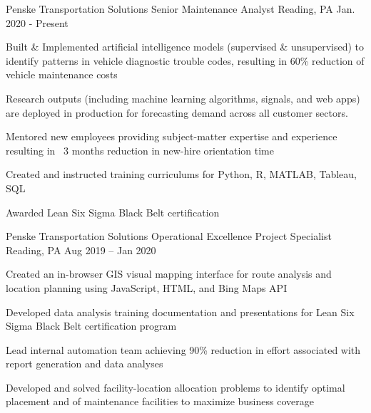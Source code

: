 


\begin{cventries}


\cventry
{Penske Transportation Solutions} %
{Senior Maintenance Analyst} %
{Reading, PA} %
{Jan. 2020 - Present} %
{ %
\begin{cvitems}
\item {Built \& Implemented artificial intelligence models (supervised \& unsupervised) to identify patterns in vehicle diagnostic trouble codes, resulting in 60\% reduction of vehicle maintenance costs}
\item {Research outputs (including machine learning algorithms, signals, and web apps) are deployed in production for forecasting demand across all customer sectors.}
\item {Mentored new employees providing subject-matter expertise and experience resulting in ~3 months reduction in new-hire orientation time}
\item {Created and instructed training curriculums for Python, R, MATLAB, Tableau, SQL}
\item {Awarded Lean Six Sigma Black Belt certification}
\end{cvitems}
}


\cventry
{Penske Transportation Solutions} %
{Operational Excellence Project Specialist} %
{Reading, PA} %
{Aug 2019 – Jan 2020} %
{ %
\begin{cvitems}
\item {Created an in-browser GIS visual mapping interface for route analysis and location planning using JavaScript, HTML, and Bing Maps API}
\item {Developed data analysis training documentation and presentations for Lean Six Sigma Black Belt certification program}
\item {Lead internal automation team achieving 90\% reduction in effort associated with report generation and data analyses}
\item {Developed and solved facility-location allocation problems to identify optimal placement and  of maintenance facilities to maximize business coverage}
\end{cvitems}
}


\end{cventries}
